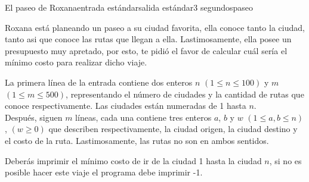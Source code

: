 \begin{problem}{El paseo de Roxana}{entrada estándar}{salida estándar}{3 segundos}{paseo}

Roxana está planeando un paseo a su ciudad favorita, ella conoce tanto la ciudad, tanto asi que conoce las rutas que llegan a ella. Lastimosamente, ella posee un presupuesto muy apretado, por esto, te pidió el favor de calcular cuál sería el mínimo costo para realizar dicho viaje.

\InputFile

La primera línea de la entrada contiene dos enteros $n$ $(1 \leq n \leq 100)$ y $m$ $(1 \leq m \leq 500)$, representando el número de ciudades y la cantidad de rutas que conoce respectivamente. Las ciudades están numeradas de 1 hasta $n$.\\
Después, siguen $m$ líneas, cada una contiene tres enteros $a$, $b$ y $w$ $(1 \leq a, b \leq n)$, $(w \geq 0)$ que describen respectivamente, la ciudad origen, la ciudad destino y el costo de la ruta. Lastimosamente, las rutas no son en ambos sentidos.

\OutputFile

Deberás imprimir el mínimo costo de ir de la ciudad 1 hasta la ciudad $n$, si no es posible hacer este viaje el programa debe imprimir -1.

\Example

\begin{example}
%
\end{example}

\Example

\begin{example}
%
\end{example}
\end{problem}
